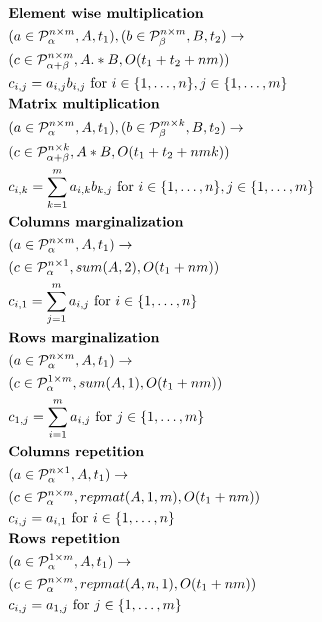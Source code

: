 \documentclass{article}
\begin{document}
\begin{align*}
&\text{{\bf Element wise multiplication}}\\
&(a \in \mathcal{P}^{n \times m}_\alpha, A, t_1), (b \in \mathcal{P}^{n \times m}_\beta, B, t_2) \rightarrow \\ 
&(c \in \mathcal{P}^{n \times m}_{\alpha + \beta}, A .* B, O(t_1 + t_2 + nm)) \\
&c_{i,j} = a_{i,j}b_{i, j} \text{ for } i \in \{1, \dots, n\}, j \in \{1, \dots, m\} \\
&\text{{\bf Matrix multiplication}}\\
&(a \in \mathcal{P}^{n \times m}_\alpha, A, t_1), (b \in \mathcal{P}^{m \times k}_\beta, B, t_2) \rightarrow \\ 
&(c \in \mathcal{P}^{n \times k}_{\alpha + \beta}, A * B, O(t_1 + t_2 + nmk)) \\
&c_{i,k} = \sum_{k = 1}^m a_{i,k}b_{k, j} \text{ for } i \in \{1, \dots, n\}, j \in \{1, \dots, m\} \\
&\text{{\bf Columns marginalization}}\\
&(a \in \mathcal{P}^{n \times m}_\alpha, A, t_1) \rightarrow \\ 
&(c \in \mathcal{P}^{n \times 1}_\alpha, sum(A, 2), O(t_1 + nm)) \\
&c_{i, 1} = \sum_{j = 1}^m a_{i, j} \text{ for } i \in \{1, \dots, n\}\\
&\text{{\bf Rows marginalization}}\\
&(a \in \mathcal{P}^{n \times m}_\alpha, A, t_1) \rightarrow \\ 
&(c \in \mathcal{P}^{1 \times m}_\alpha, sum(A, 1), O(t_1 + nm)) \\
&c_{1, j} = \sum_{i = 1}^m a_{i, j} \text{ for } j \in \{1, \dots, m\}\\
&\text{{\bf Columns repetition}}\\
&(a \in \mathcal{P}^{n \times 1}_\alpha, A, t_1) \rightarrow \\ 
&(c \in \mathcal{P}^{n \times m}_\alpha, repmat(A, 1, m), O(t_1 + nm)) \\
&c_{i, j} = a_{i, 1} \text{ for } i \in \{1, \dots, n\}\\
&\text{{\bf Rows repetition}}\\
&(a \in \mathcal{P}^{1 \times m}_\alpha, A, t_1) \rightarrow \\ 
&(c \in \mathcal{P}^{n \times m}_\alpha, repmat(A, n, 1), O(t_1 + nm)) \\
&c_{i, j} = a_{1, j} \text{ for } j \in \{1, \dots, m\}\\

\end{align*}
\end{document}
